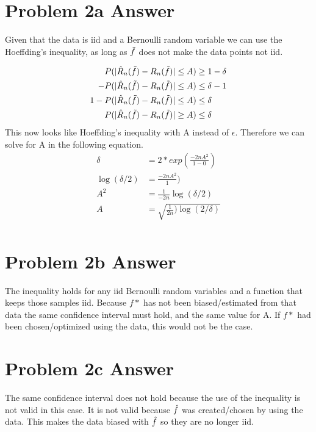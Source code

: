 \documentclass{article}
\newcommand{\1}{\mathbf{1}}
\begin{document}
\section*{Problem 2a Answer}
Given that the data is iid and a Bernoulli random variable we can use the Hoeffding's inequality, as long as $\Tilde{f}$ does not make the data points not iid. 

\begin{align*}
    P(|\Hat{R}_n(\Tilde{f}) - R_n(\Tilde{f}) | \leq A ) & \geq 1- \delta  \\
    -P(|\Hat{R}_n(\Tilde{f}) - R_n(\Tilde{f}) |\leq A ) & \leq  \delta - 1  \\
    1-P(|\Hat{R}_n(\Tilde{f}) - R_n(\Tilde{f}) | \leq A) & \leq  \delta \\
    P(|\Hat{R}_n(\Tilde{f}) - R_n(\Tilde{f}) | \geq A) & \leq  \delta \\
\end{align*}
This now looks like Hoeffding's inequality with A instead of $\epsilon$. Therefore we can solve for A in the following equation. 
\begin{align*}
    \delta & = 2 * exp(\frac{-2 n A^2}{ 1 - 0})\\
    \log( \delta / 2 )  & = \frac{-2 n A^2}{ 1})\\
    A^2 & = \frac{1}{ -2n} \log( \delta / 2 ) \\
    A & = \sqrt{ \frac{1}{2n}) \log( 2/\delta) } \\
\end{align*}


\section*{Problem 2b Answer}
The inequality holds for any iid Bernoulli random variables and a function that keeps those samples iid. Because $f*$ has not been biased/estimated from that data the same confidence interval must hold, and the same value for A. If $f*$ had been chosen/optimized using the data, this would not be the case. 

\section*{Problem 2c Answer}
The same confidence interval does not hold because the use of the inequality is not valid in this case. It is not valid because $\Hat{f}$ was created/chosen by using the data. This makes the data biased with $\Hat{f}$ so they are no longer iid. 
\end{document}
